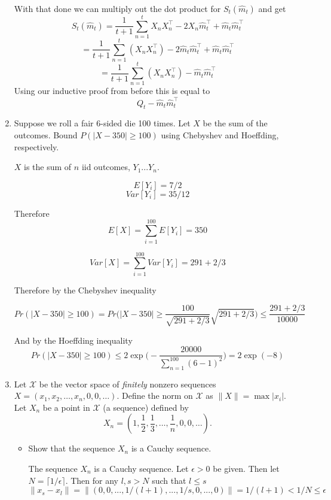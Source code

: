 \documentclass{article}
\begin{document}
\begin{enumerate}
With that done we can multiply out the dot product for $S_t(\hat m_t)$ and get
$$
S_t(\hat m_t) = \frac{1}{t+1} \sum_{n=1} ^ t X_n X_n^\top -2X_n \hat m_t ^\top + \hat m_t \hat m_t^\top
$$
$$
= \frac{1}{t+1} \sum_{n=1} ^ t (X_n X_n^\top) -2\hat m_t \hat m_t^\top + \hat m_t \hat m_t^\top
$$
$$
 = \frac{1}{t+1} \sum_{n=1} ^ t (X_n X_n^\top)  - \hat m_t \hat m_t^\top
$$
Using our inductive proof from before this is equal to 
$$
Q_t - \hat m_t \hat m_t^\top
$$

\color{black}


\item
Suppose we roll a fair 6-sided die 100 times. Let $X$ be the sum of the outcomes.  Bound $P(|X-350| \ge 100)$ using Chebyshev and Hoeffding, respectively.

\color{blue}

$X$ is the sum of $n$ iid outcomes, $Y_1 ... Y_n$.

\[
E[Y_i] = 7/2
\]
\[
Var[Y_i] = 35/12
\]

Therefore
$$E[X] = \sum_{i=1} ^{100} E[Y_i] = 350$$

$$Var[X] = \sum_{i=1} ^{100} Var[Y_i] =  291 + 2/3$$

Therefore by the Chebyshev inequality

\[
Pr(|X-350| \geq 100) = Pr\bigg(|X-350| \geq \frac{100}{\sqrt{291+2/3}}\sqrt{291+ 2/3}\bigg) \leq \frac{291+2/3}{10000}
\]

And by the Hoeffding inequality
$$Pr(|X-350| \geq 100) \leq 2 \exp \bigg( -\frac{20000}{\sum_{n=1}^{100}(6-1)^2} \bigg) = 2 \exp (-8)$$

\color{black}

\item
Let $\mathcal X$ be the vector space of \emph{finitely} nonzero sequences $X=(x_1, x_2, \ldots, x_n, 0, 0, \ldots)$.
Define the norm on $\mathcal X$ as $\|X\|=\max |x_i|$.
Let $X_n$ be a point in $\mathcal X$ (a sequence) defined by
$$X_n = \left(1, \frac{1}{2}, \frac{1}{3}, \ldots, \frac{1}{n}, 0, 0, \ldots \right).$$

\begin{itemize}
\item
Show that the sequence $X_n$ is a Cauchy sequence.

\color{blue}
The sequence $X_n$ is a Cauchy sequence. Let $\epsilon > 0$ be given. 
Then let $N= \lceil 1/\epsilon \rceil$. Then for any $l,s > N$
such that $l \leq s$
$$
\|x_s - x_l\| = \|(0,0,...,1/(l+1), ..., 1/s,0,...,0)\| = 1/(l+1) < 1/N \leq \epsilon
$$
\color{black}


\end{itemize}
\end{enumerate}
\end{document}
